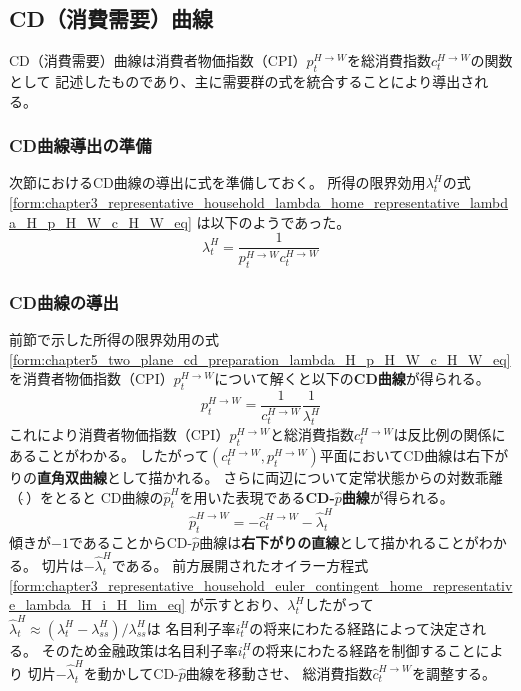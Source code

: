 
\subsection{CD（消費需要）曲線}
\label{sec:chapter5_two_plane_cd}
CD（消費需要）曲線は消費者物価指数（CPI）\(p_t^{H\to W}\)を総消費指数\(c_t^{H\to W}\)の関数として
記述したものであり、主に需要群の式を統合することにより導出される。

\subsubsection{CD曲線導出の準備}
\label{sec:chapter5_two_plane_cd_preparation}
次節におけるCD曲線の導出に式を準備しておく。
所得の限界効用\(\lambda_t^H\)の式
\eqref{form:chapter3_representative_household_lambda_home_representative_lambda_H_p_H_W_c_H_W_eq}
は以下のようであった。
\begin{equation}
\label{form:chapter5_two_plane_cd_preparation_lambda_H_p_H_W_c_H_W_eq}
    \lambda_t^H=\frac{1}{p_t^{H\to W}c_t^{H\to W}}
\end{equation}

\subsubsection{CD曲線の導出}
\label{sec:chapter5_two_plane_cd_derivation}
前節で示した所得の限界効用の式
\eqref{form:chapter5_two_plane_cd_preparation_lambda_H_p_H_W_c_H_W_eq}
を消費者物価指数（CPI）\(p_t^{H\to W}\)について解くと以下の\textbf{CD曲線}が得られる。
\begin{equation}
\label{form:chapter5_two_plane_cd_derivation_p_H_W_c_H_W_modified_eq}
    p_t^{H\to W}=\frac{1}{c_t^{H\to W}}\frac{1}{\lambda_t^H}
\end{equation}
これにより消費者物価指数（CPI）\(p_t^{H\to W}\)と総消費指数\(c_t^{H\to W}\)は反比例の関係にあることがわかる。
したがって\((c_t^{H\to W},p_t^{H\to W})\)平面においてCD曲線は右下がりの\textbf{直角双曲線}として描かれる。
さらに両辺について定常状態からの対数乖離（\(\hat{\ }\)）をとると
CD曲線の\(\hat{p}_t^H\)を用いた表現である\textbf{CD-\(\hat{p}\)曲線}が得られる。
\begin{equation}
\label{form:chapter5_two_plane_cd_derivation_p_H_W_hat_eq}
    \hat{p}_t^{H\to W}=-\hat{c}_t^{H\to W}-\hat{\lambda}_t^H
\end{equation}
傾きが\(-1\)であることからCD-\(\hat{p}\)曲線は\textbf{右下がりの直線}として描かれることがわかる。
切片は\(-\hat{\lambda}_t^H\)である。
前方展開されたオイラー方程式
\eqref{form:chapter3_representative_household_euler_contingent_home_representative_lambda_H_i_H_lim_eq}
が示すとおり、\(\lambda_t^H\)したがって
\(\hat{\lambda}_t^H\approx(\lambda_t^H-\lambda_{ss}^H)/\lambda_{ss}^H\)は
名目利子率\(i_t^H\)の将来にわたる経路によって決定される。
そのため金融政策は名目利子率\(i_t^H\)の将来にわたる経路を制御することにより
切片\(-\hat{\lambda}_t^H\)を動かしてCD-\(\hat{p}\)曲線を移動させ、
総消費指数\(\hat{c}_t^{H\to W}\)を調整する。